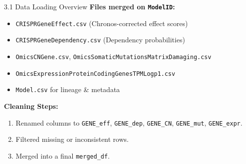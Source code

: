 \documentclass[10pt]{beamer}
\begin{document}
\begin{frame}{3.1 Data Loading Overview}
  \textbf{Files merged on \texttt{ModelID}:}
  \begin{itemize}
    \item \texttt{CRISPRGeneEffect.csv} (Chronos-corrected effect scores)
    \item \texttt{CRISPRGeneDependency.csv} (Dependency probabilities)
    \item \texttt{OmicsCNGene.csv}, \texttt{OmicsSomaticMutationsMatrixDamaging.csv}
    \item \texttt{OmicsExpressionProteinCodingGenesTPMLogp1.csv}
    \item \texttt{Model.csv} for lineage \& metadata
  \end{itemize}
  \vspace{0.3cm}
  \textbf{Cleaning Steps:}
  \begin{enumerate}
    \item Renamed columns to \texttt{GENE\_eff}, \texttt{GENE\_dep}, \texttt{GENE\_CN}, \texttt{GENE\_mut}, \texttt{GENE\_expr}.
    \item Filtered missing or inconsistent rows.
    \item Merged into a final \texttt{merged\_df}.
  \end{enumerate}
\end{frame}
\end{document}
